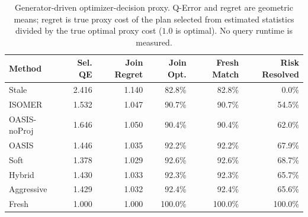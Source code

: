 \begin{table}[t]
  \centering
  \small
  \caption{Generator-driven optimizer-decision proxy. Q-Error and regret are geometric means; regret is true proxy cost of the plan selected from estimated statistics divided by the true optimal proxy cost ($1.0$ is optimal). No query runtime is measured.}
  \label{tab:optimizer_decision_proxy}
  \setlength{\tabcolsep}{4pt}
  \begin{tabular}{lrrrrr}
    \toprule
    Method & Sel. QE & Join Regret & Join Opt. & Fresh Match & Risk Resolved \\
    \midrule
    Stale & 2.416 & 1.140 & 82.8\% & 82.8\% & 0.0\% \\
    ISOMER & 1.532 & 1.047 & 90.7\% & 90.7\% & 54.5\% \\
    OASIS-noProj & 1.646 & 1.050 & 90.4\% & 90.4\% & 62.0\% \\
    OASIS & 1.446 & 1.035 & 92.2\% & 92.2\% & 67.9\% \\
    Soft & 1.378 & 1.029 & 92.6\% & 92.6\% & 68.7\% \\
    Hybrid & 1.430 & 1.033 & 92.3\% & 92.3\% & 65.7\% \\
    Aggressive & 1.429 & 1.032 & 92.4\% & 92.4\% & 65.6\% \\
    Fresh & 1.000 & 1.000 & 100.0\% & 100.0\% & 100.0\% \\
    \bottomrule
  \end{tabular}
\end{table}
